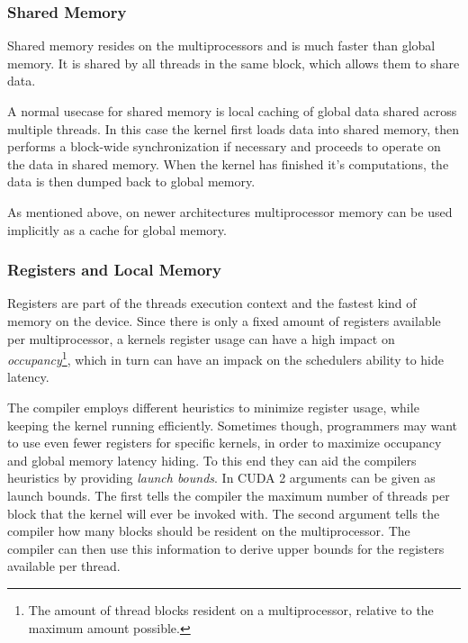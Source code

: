 \subsubsection{Shared Memory}


Shared memory resides on the multiprocessors and is much faster than
global memory. It is shared by all threads in the same block, which
allows them to share data.


A normal usecase for shared memory is local caching of global data
shared across multiple threads. In this case the kernel first loads
data into shared memory, then performs a block-wide synchronization if
necessary and proceeds to operate on the data in shared memory. When
the kernel has finished it's computations, the data is then dumped
back to global memory.


As mentioned above, on newer architectures multiprocessor memory can
be used implicitly as a cache for global memory.




\subsubsection{Registers and Local Memory}


Registers are part of the threads execution context and the fastest
kind of memory on the device. Since there is only a fixed amount of
registers available per multiprocessor, a kernels register usage can
have a high impact on \textit{occupancy}\footnote{The amount of thread
  blocks resident on a multiprocessor, relative to the maximum amount
  possible.}, which in turn can have an impack on the schedulers
ability to hide latency.


The compiler employs different heuristics to minimize register usage,
while keeping the kernel running efficiently. Sometimes though,
programmers may want to use even fewer registers for specific kernels,
in order to maximize occupancy and global memory latency hiding. To
this end they can aid the compilers heuristics by providing
\textit{launch bounds}. In CUDA 2 arguments can be given as launch
bounds. The first tells the compiler the maximum number of threads per
block that the kernel will ever be invoked with. The second argument
tells the compiler how many blocks should be resident on the
multiprocessor. The compiler can then use this information to derive
upper bounds for the registers available per thread.

